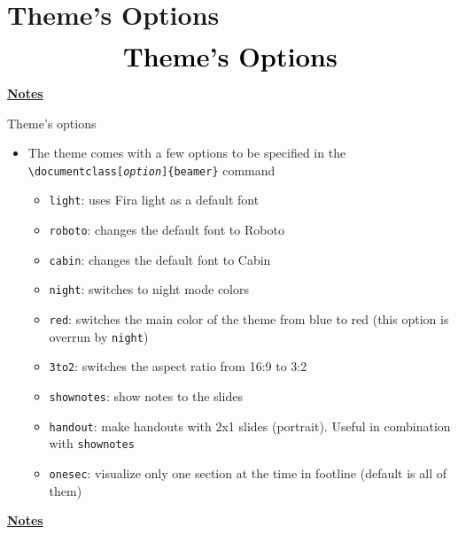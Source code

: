\documentclass[10pt]{beamer}
\begin{document}
\section[Options]{Theme's Options}
\begin{frame}
    \begin{eqnarray*}
        &\text{{\huge \textbf{Theme's Options}}}\\
    \end{eqnarray*}
\end{frame}
\begin{flushleft}
    \underline{\textbf{Notes}}\setlength{\parskip}{.15cm}\notesize\newline\par
\end{flushleft}

\begin{frame}
	{Theme's options}
	\begin{itemize}
		\item The theme comes with a few options to be specified in the \texttt{\textbackslash documentclass[\textit{option}]\{beamer\}} command \medskip
		\begin{itemize}
			\item \texttt{light}: uses Fira light as a default font\medskip
			\item \texttt{roboto}: changes the default font to Roboto\medskip
			\item \texttt{cabin}: changes the default font to Cabin\medskip
			\item \texttt{night}: switches to night mode colors \medskip
			\item \texttt{red}: switches the main color of the theme from blue to red (this option is overrun by \texttt{night})\medskip
			\item \texttt{3to2}: switches the aspect ratio from 16:9 to 3:2\medskip
			\item \texttt{shownotes}: show notes to the slides \medskip
			\item \texttt{handout}: make handouts with 2x1 slides (portrait). Useful in combination with \texttt{shownotes}\medskip
            \item \texttt{onesec}: visualize only one section at the time in footline (default is all of them)
		\end{itemize}
	\end{itemize}
\end{frame}
\begin{flushleft}
	\underline{\textbf{Notes}}\setlength{\parskip}{.15cm}\notesize\newline\par
\end{flushleft}
\end{document}
